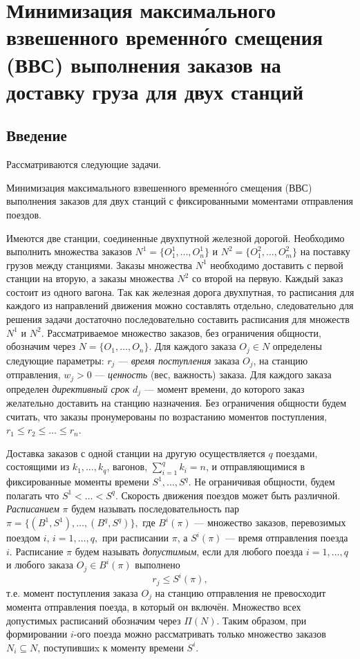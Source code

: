 \section{Минимизация максимального взвешенного временн\'{о}го смещения (ВВС) выполнения заказов на доставку груза
  для двух станций}
\subsection{Введение}\label{rzd:sec:int:1}
Рассматриваются следующие задачи.\\
\begin{problem}\label{rzd:pr:1}
Минимизация максимального взвешенного временн\'{о}го смещения (ВВС) выполнения заказов
  для двух станций с фиксированными моментами отправления поездов.
\end{problem}

Имеются две станции, соединенные двухпутной железной
дорогой. Необходимо выполнить множества заказов
$N^1 = \{O_1^1,\dots,O_n^1\}$ и $N^2=\{O_1^2,\dots,O_m^2\}$ на поставку
грузов между станциями. Заказы множества $N^1$ необходимо доставить с
первой станции на вторую, а заказы множества $N^2$ со второй на
первую. Каждый заказ состоит из одного вагона. Так как железная дорога двухпутная, то расписания для каждого из направлений движения можно составлять отдельно, следовательно для решения задачи достаточно последовательно составить расписания для множеств $N^1$ и $N^2$. Рассматриваемое множество заказов, без ограничения общности, обозначим через $N = \{O_1, \dots, O_n\}$. Для каждого заказа $O_j \in N$ определены следующие параметры: $r_j$ --- \textit{время поступления} заказа $O_j$, на станцию отправления, $w_j > 0$ --- \textit{ценность} (вес, важность) заказа. Для каждого заказа определен \textit{директивный срок} $d_j$ --- момент времени, до которого заказ желательно доставить на станцию назначения. Без ограничения общности будем считать, что заказы пронумерованы по возрастанию моментов поступления, $r_1 \leq r_2 \leq \dots \leq r_n$.

Доставка заказов с одной станции на другую осуществляется $q$ поездами, состоящими из $k_1, \dots, k_q$, вагонов, $\sum\limits_{i=1}^q k_i = n$, и отправляющимися в фиксированные моменты времени $S^1, \dots, S^q$. Не ограничивая общности, будем полагать что $S^1< \dots < S^q$. Скорость движения поездов может быть различной. \textit{Расписанием} $\pi$ будем называть последовательность пар $ \pi = \{(B^1, S^1), \dots, (B^q, S^q)\},$ где $B^i(\pi)$ --- множество заказов, перевозимых поездом $i$, $i=1, \dots, q,$ при расписании $\pi$, а $S^i(\pi)$ --- время отправления поезда $i$. Расписание $\pi$ будем называть \textit{допустимым}, если для любого поезда $i = 1, \dots, q$ и любого заказа $O_j \in B^i(\pi)$ выполнено
$$r_j \leq S^i(\pi),$$
т.е. момент поступления заказа $O_j$ на станцию отправления не превосходит момента отправления поезда, в который он включён. Множество всех допустимых расписаний обозначим через $\Pi(N)$. Таким образом, при формировании $i$-ого поезда можно рассматривать только множество заказов $N_i \subseteq N$, поступившиx к моменту времени $S^i$.

